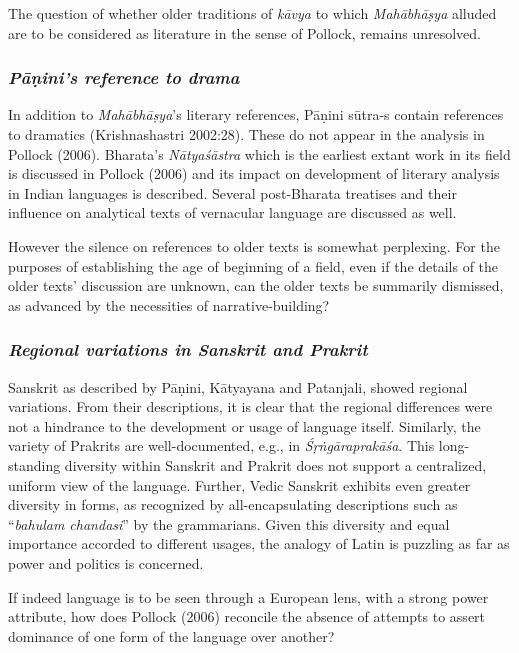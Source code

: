 The question of whether older traditions of {\sl kāvya} to which {\sl Mahābhāṣya} alluded are to be considered as literature in the sense of Pollock, remains unresolved.

\subsubsection{{\sl Pāṇini’s reference to drama}}

In addition to {\sl Mahābhāṣya}’s literary references, Pāṇini sūtra-s contain references to dramatics (Krishnashastri 2002:28). These do not appear in the analysis in Pollock (2006). Bharata’s {\sl Nātyaśāstra} which is the earliest extant work in its field is discussed in Pollock (2006) and its impact on development of literary analysis in Indian languages is described. Several post-Bharata treatises and their influence on analytical texts of vernacular language are discussed as well.

However the silence on references to older texts is somewhat perplexing. For the purposes of establishing the age of beginning of a field, even if the details of the older texts’ discussion are unknown, can the older texts be summarily dismissed, as advanced by the necessities of narrative-building?

\subsubsection{{\sl Regional variations in Sanskrit and Prakrit}}

Sanskrit as described by Pāṇini, Kātyayana and Patanjali, showed regional variations. From their descriptions, it is clear that the regional differences were not a hindrance to the development or usage of language itself. Similarly, the variety of Prakrits are well-documented, e.g., in {\sl Śṛṅgāraprakāśa}. This long-standing diversity within Sanskrit and Prakrit does not support a centralized, uniform view of the language. Further, Vedic Sanskrit exhibits even greater diversity in forms, as recognized by all-encapsulating descriptions such as “{\sl bahulam chandasi}” by the grammarians. Given this diversity and equal importance accorded to different usages, the analogy of Latin is puzzling as far as power and politics is concerned. 

If indeed language is to be seen through a European lens, with a strong power attribute, how does Pollock (2006) reconcile the absence of attempts to assert dominance of one form of the language over another? 
\vskip -40pt

